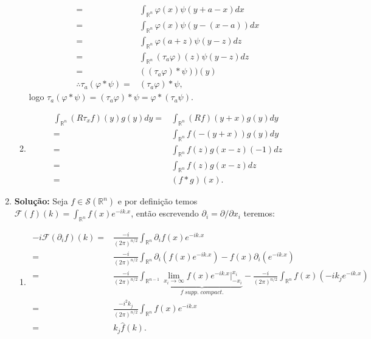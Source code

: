 \documentclass{article}
\begin{document}
\begin{enumerate}
\begin{enumerate}
$$\begin{aligned}
				\\
				= & \int_{\mathbb{R}^{n}}\varphi(x)\psi(y+a-x)dx
				\\
				= & \int_{\mathbb{R}^{n}}\varphi(x)\psi(y-(x-a))dx
				\\
				= & \int_{\mathbb{R}^{n}}\varphi(a+z)\psi(y-z)dz
				\\
				= & \int_{\mathbb{R}^{n}} (\tau_{a}\varphi)(z)\psi(y-z)dz
				\\
				= & ((\tau_{a}\varphi)*\psi))(y)
				\\
				\therefore \tau_{a}(\varphi*\psi) = & (\tau_{a}\varphi)*\psi,
				\end{aligned}
				$$
				logo $\tau_{a}(\varphi*\psi) = (\tau_{a}\varphi)*\psi = \varphi*(\tau_{a}\psi)$.
				
				\item
				$$
				\begin{aligned}
				\int_{\mathbb{R}^{n}} (R\tau_{x}f)(y)g(y)dy = & \int_{\mathbb{R}^{n}} (Rf)(y+x)g(y)dy
				\\ = & \int_{\mathbb{R}^{n}} f(-(y+x))g(y)dy
				\\ = & \int_{\mathbb{R}^{n}} f(z)g(x-z)(-1)dz
				\\ = & \int_{\mathbb{R}^{n}} f(z)g(x-z)dz
				\\ = & (f*g)(x).
				\end{aligned}
				$$
			\end{enumerate}
		\item \textbf{Solução:} Seja $f \in \mathcal{S}(\mathbb{R}^{n})$ e por definição temos $\mathcal{F}(f)(k) = \int_{\mathbb{R}^{n}} f(x)e^{-ik.x}$, então escrevendo $\partial_{i} = \partial/\partial x_{i}$ teremos:
			\begin{enumerate}
				\item 
				$$
				\begin{aligned}
				-i\mathcal{F}(\partial_{i}f)(k) = & \frac{-i}{(2\pi)^{n/2}}\int_{\mathbb{R}^{n}} \partial_{i}f(x)e^{-ik.x}
				\\
				= & \frac{-i}{(2\pi)^{n/2}}\int_{\mathbb{R}^{n}} \partial_{i}( f(x)e^{-ik.x} ) - f(x)\partial_{i}(e^{-ik.x})
				\\
				= & \frac{-i}{(2\pi)^{n/2}}\int_{\mathbb{R}^{n-1}} \underbrace{ \lim_{x_{i} \to \infty} f(x)e^{-ik.x} \Big|^{x_{i}}_{-x_{i}} }_{f \; supp. \; compact.} - \frac{-i}{(2\pi)^{n/2}}\int_{\mathbb{R}^{n}}  f(x) (-ik_{j}e^{-ik.x})
				\\
				= & \frac{-i^{2}k_{j}}{(2\pi)^{n/2}}\int_{\mathbb{R}^{n}}  f(x) e^{-ik.x}
				\\
				= & k_{j}\hat{f}(k).	
				\end{aligned}
				$$
				

\end{enumerate}
\end{enumerate}
\end{document}
